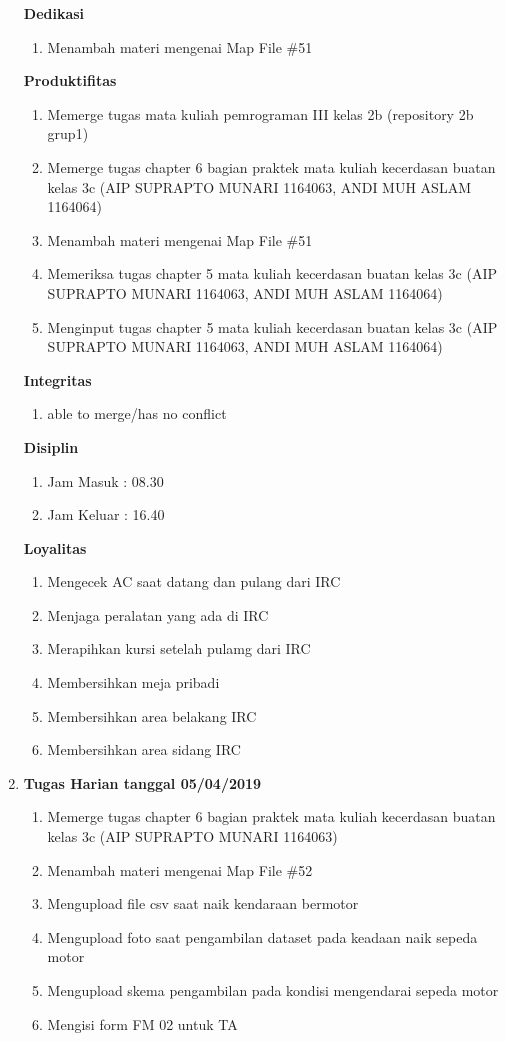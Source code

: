 \begin{enumerate}
\textbf{Dedikasi}
\begin{enumerate}
\item Menambah materi mengenai Map File \#51
\end{enumerate}

\textbf{Produktifitas}
\begin{enumerate}
\item Memerge tugas mata kuliah pemrograman III kelas 2b (repository 2b grup1)
\item Memerge tugas chapter 6 bagian praktek mata kuliah kecerdasan buatan kelas 3c (AIP SUPRAPTO MUNARI 1164063, ANDI MUH ASLAM 1164064)
\item Menambah materi mengenai Map File \#51
\item Memeriksa tugas chapter 5 mata kuliah kecerdasan buatan kelas 3c (AIP SUPRAPTO MUNARI 1164063, ANDI MUH ASLAM 1164064)
\item Menginput tugas chapter 5 mata kuliah kecerdasan buatan kelas 3c (AIP SUPRAPTO MUNARI 1164063, ANDI MUH ASLAM 1164064) 
\end{enumerate}

\textbf{Integritas}
\begin{enumerate}
\item able to merge/has no conflict
\end{enumerate}

\textbf{Disiplin}
\begin{enumerate}
\item Jam Masuk : 08.30
\item Jam Keluar : 16.40
\end{enumerate}

\textbf{Loyalitas}
\begin{enumerate}
\item Mengecek AC saat datang dan pulang dari IRC
\item Menjaga peralatan yang ada di IRC
\item Merapihkan kursi setelah pulamg dari IRC
\item Membersihkan meja pribadi
\item Membersihkan area belakang IRC
\item Membersihkan area sidang IRC
\end{enumerate}

\item \textbf{Tugas Harian tanggal 05/04/2019}
\begin{enumerate}
\item Memerge tugas chapter 6 bagian praktek mata kuliah kecerdasan buatan kelas 3c (AIP SUPRAPTO MUNARI 1164063)
\item Menambah materi mengenai Map File \#52
\item Mengupload file csv saat naik kendaraan bermotor
\item Mengupload foto saat pengambilan dataset pada keadaan naik sepeda motor
\item Mengupload skema pengambilan pada kondisi mengendarai sepeda motor
\item Mengisi form FM 02 untuk TA
\end{enumerate}


\end{enumerate}
